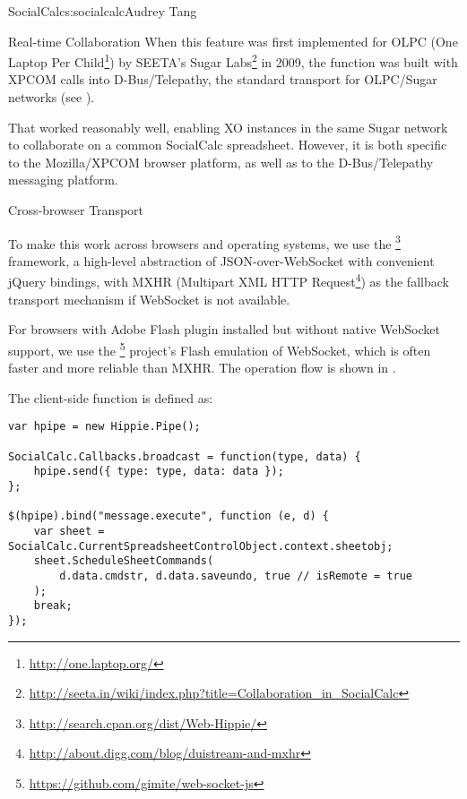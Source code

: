 \begin{aosachapter}{SocialCalc}{s:socialcalc}{Audrey Tang}
\begin{aosasect1}{Real-time Collaboration}
When this feature was first implemented for OLPC (One Laptop Per 
Child\footnote{\url{http://one.laptop.org/}}) by SEETA's Sugar 
Labs\footnote{\url{http://seeta.in/wiki/index.php?title=Collaboration_in_SocialCalc}}
in 2009, the  function was built with XPCOM calls into
D-Bus/Telepathy, the standard transport for OLPC/Sugar networks (see
).


That worked reasonably well, enabling XO instances in the same Sugar
network to collaborate on a common SocialCalc spreadsheet.  However,
it is both specific to the Mozilla/XPCOM browser platform, as well as
to the D-Bus/Telepathy messaging platform.

\begin{aosasect2}{Cross-browser Transport}

To make this work across browsers and operating systems, we use the
\footnote{\url{http://search.cpan.org/dist/Web-Hippie/}}
framework, a high-level abstraction of JSON-over-WebSocket with
convenient jQuery bindings, with MXHR (Multipart XML HTTP
Request\footnote{\url{http://about.digg.com/blog/duistream-and-mxhr}})
as the fallback transport mechanism if WebSocket is not available.

For browsers with Adobe Flash plugin installed but without native
WebSocket support, we use the
\footnote{\url{https://github.com/gimite/web-socket-js}}
project's Flash emulation of WebSocket, which is often faster and more reliable
than MXHR.  The operation flow is shown in .


\pagebreak

The client-side  function is
defined as:

\begin{verbatim}
var hpipe = new Hippie.Pipe();

SocialCalc.Callbacks.broadcast = function(type, data) {
    hpipe.send({ type: type, data: data });
};

$(hpipe).bind("message.execute", function (e, d) {
    var sheet = SocialCalc.CurrentSpreadsheetControlObject.context.sheetobj;
    sheet.ScheduleSheetCommands(
        d.data.cmdstr, d.data.saveundo, true // isRemote = true
    );
    break;
});
\end{verbatim}


\end{aosasect2}
\end{aosasect1}
\end{aosachapter}
